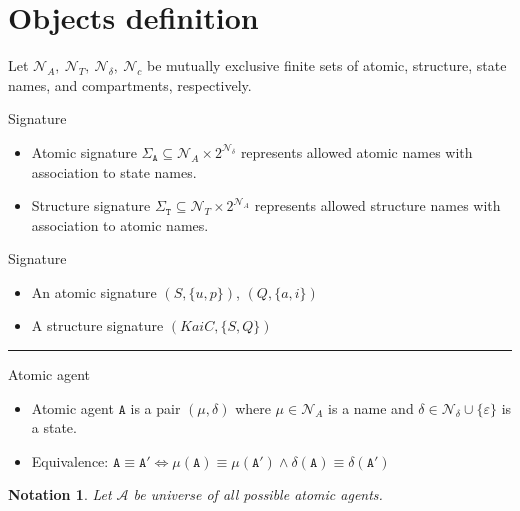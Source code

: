 \documentclass{elsarticle}
\newtheorem{notation}{Notation}
\begin{document}
\section{Objects definition}

Let $\mathcal{N}_{A},~\mathcal{N}_{T},~\mathcal{N}_{\delta},~\mathcal{N}_{c}$ be mutually exclusive finite sets of atomic, structure, state names, and compartments, respectively.

\begin{definition}{Signature}

\begin{itemize} 
\item Atomic signature $\Sigma_{\mathtt{A}} \subseteq \mathcal{N}_{A} \times 2^{\mathcal{N}_{\delta}}$ represents allowed atomic names with association to state names. 
\item Structure signature $\Sigma_{\mathtt{T}} \subseteq \mathcal{N}_{T} \times 2^{\mathcal{N}_{A}}$ represents allowed structure names with association to atomic names. 
\end{itemize}
\end{definition}

\begin{example}{Signature}

\begin{itemize}
\item An atomic signature $(S, \{u, p\})$, $(Q, \{a, i\})$
\item A structure signature $(KaiC, \{S, Q\})$
\end{itemize}
\end{example}

\noindent\rule{\textwidth}{1pt}

\begin{definition}{Atomic agent}

\begin{itemize}
\item Atomic agent $\mathtt{A}$ is a pair $(\mu, \delta)$ where $\mu \in \mathcal{N}_{A}$ is a name and $\delta \in \mathcal{N}_{\delta} \cup \{ \varepsilon \}$ is a state.

\item Equivalence: $\mathtt{A} \equiv \mathtt{A}' \Leftrightarrow \mu(\mathtt{A}) \equiv \mu(\mathtt{A}') \wedge \delta(\mathtt{A}) \equiv \delta(\mathtt{A}')$
\end{itemize}
\end{definition}

\begin{notation}
Let $\mathcal{A}$ be universe of all possible atomic agents.
\end{notation}
\end{document}
